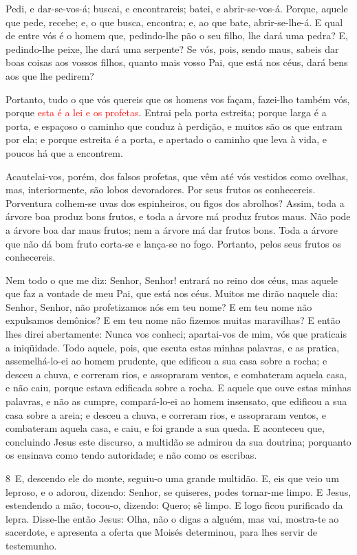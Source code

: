 Pedi, e dar-se-vos-á; buscai, e encontrareis; batei, e
abrir-se-vos-á. Porque, aquele que pede, recebe; e, o que busca,
encontra; e, ao que bate, abrir-se-lhe-á. E qual de entre vós é
o homem que, pedindo-lhe pão o seu filho, lhe dará uma pedra?
E, pedindo-lhe peixe, lhe dará uma serpente? Se vós,
pois, sendo maus, sabeis dar boas coisas aos vossos filhos, quanto
mais vosso Pai, que está nos céus, dará bens aos que lhe pedirem?

Portanto, tudo o que vós quereis que os homens vos façam,
fazei-lho também vós, porque \textcolor{red}{esta é a lei e os profetas}.
Entrai pela porta estreita; porque larga é a porta, e
espaçoso o caminho que conduz à perdição, e muitos são os que entram
por ela; e porque estreita é a porta, e apertado o caminho
que leva à vida, e poucos há que a encontrem.

A\-cau\-te\-lai-vos, porém, dos falsos profetas, que vêm até vós
vestidos como ovelhas, mas, interiormente, são lobos devoradores.
Por seus frutos os conhecereis. Porventura colhem-se uvas dos
espinheiros, ou figos dos abrolhos? Assim, toda a árvore boa
produz bons frutos, e toda a árvore má produz frutos maus.
Não pode a árvore boa dar maus frutos; nem a árvore má dar
frutos bons. Toda a árvore que não dá bom fruto corta-se e
lança-se no fogo. Portanto, pelos seus frutos os conhecereis.

Nem todo o que me diz: Senhor, Senhor! entrará no reino dos céus,
mas aquele que faz a vontade de meu Pai, que está nos céus.
Muitos me dirão naquele dia: Senhor, Senhor, não profetizamos
nós em teu nome? E em teu nome não expulsamos demônios? E em teu
nome não fizemos muitas maravilhas? E então lhes direi
abertamente: Nunca vos conheci; apartai-vos de mim, vós que
praticais a iniqüidade. Todo aquele, pois, que escuta estas
minhas palavras, e as pratica, assemelhá-lo-ei ao homem prudente,
que edificou a sua casa sobre a rocha; e desceu a chuva, e
correram rios, e assopraram ventos, e combateram aquela casa, e não
caiu, porque estava edificada sobre a rocha. E aquele que
ouve estas minhas palavras, e não as cumpre, compará-lo-ei ao homem
insensato, que edificou a sua casa sobre a areia; e desceu a
chuva, e correram rios, e assopraram ventos, e combateram aquela
casa, e caiu, e foi grande a sua queda. E aconteceu que,
concluindo Jesus este discurso, a multidão se admirou da sua
doutrina; porquanto os ensinava como tendo autoridade; e não
como os escribas.

\medskip

\lettrine{8}\ E, descendo ele do monte, seguiu-o uma grande
multidão. E, eis que veio um leproso, e o adorou, dizendo:
Senhor, se quiseres, podes tornar-me limpo. E Jesus, estendendo
a mão, tocou-o, dizendo: Quero; sê limpo. E logo ficou purificado da
lepra. Disse-lhe então Jesus: Olha, não o digas a alguém, mas
vai, mostra-te ao sacerdote, e apresenta a oferta que Moisés
determinou, para lhes servir de testemunho.

